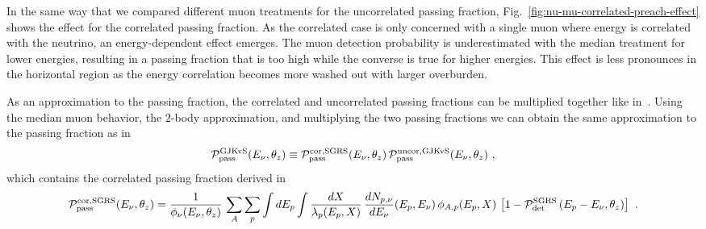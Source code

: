 In the same way that we compared different muon treatments for the uncorrelated passing fraction, Fig.~\ref{fig:nu-mu-correlated-preach-effect} shows the effect for the correlated passing fraction.
As the correlated case is only concerned with a single muon where energy is correlated with the neutrino, an energy-dependent effect emerges.
The muon detection probability is underestimated with the median treatment for lower energies, resulting in a passing fraction that is too high while the converse is true for higher energies.
This effect is less pronounces in the horizontal region as the energy correlation becomes more washed out with larger overburden.

As an approximation to the passing fraction, the correlated and uncorrelated passing fractions can be multiplied together like in~\cite{Gaisser:2014bja}.
Using the median muon behavior, the $2$-body approximation, and multiplying the two passing fractions we can obtain the same approximation to the passing fraction as in~\cite{Gaisser:2014bja}
\begin{equation}
\label{eq:PGJKvS}
{\mathcal P}_{\rm pass}^{\rm GJKvS} (E_\nu, \theta_z) \equiv {\mathcal P}_{\rm pass}^{\rm cor, SGRS}(E_\nu, \theta_z) \, {\mathcal P}_{\rm pass}^{\rm uncor, GJKvS}(E_\nu, \theta_z) ~,
\end{equation}
which contains the correlated passing fraction derived in~\cite{Schonert:2008is}
\begin{equation}
\label{eq:PcorSGRS}
{\mathcal P}_{\rm pass}^{\rm cor, SGRS}(E_\nu, \theta_z) = \frac{1}{\phi_\nu(E_\nu, \theta_z)} \, \sum_A \sum_{p} \int dE_p  \int \frac{dX}{\lambda_p(E_p, X)} \, \frac{dN_{p, \nu}}{dE_\nu}(E_p, E_\nu) \, \phi_{A, p}(E_p, X) \,
\left[1 - {\mathcal P}_{\rm det}^{\rm SGRS}\left(E_p-E_\nu , \theta_z\right)\right]~.
\end{equation}

